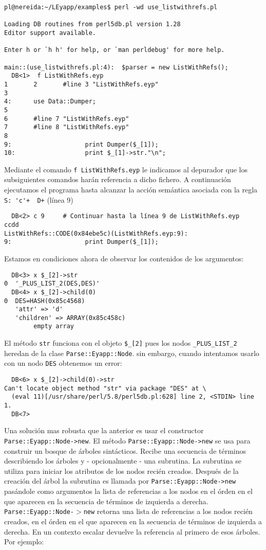 \begin{verbatim}
pl@nereida:~/LEyapp/examples$ perl -wd use_listwithrefs.pl

Loading DB routines from perl5db.pl version 1.28
Editor support available.

Enter h or `h h' for help, or `man perldebug' for more help.

main::(use_listwithrefs.pl:4):  $parser = new ListWithRefs();
  DB<1>  f ListWithRefs.eyp
1       2       #line 3 "ListWithRefs.eyp"
3
4:      use Data::Dumper;
5
6       #line 7 "ListWithRefs.eyp"
7       #line 8 "ListWithRefs.eyp"
8
9:                    print Dumper($_[1]);
10:                   print $_[1]->str."\n";
\end{verbatim}
Mediante el comando \verb|f ListWithRefs.eyp| le indicamos 
al depurador que los subsiguientes comandos harán referencia
a dicho fichero. A continuación ejecutamos el programa hasta alcanzar 
la acción semántica asociada con la regla \verb|S: 'c'+  D+|
(línea 9)
\begin{verbatim}
  DB<2> c 9     # Continuar hasta la línea 9 de ListWithRefs.eyp
ccdd
ListWithRefs::CODE(0x84ebe5c)(ListWithRefs.eyp:9):
9:                    print Dumper($_[1]);
\end{verbatim}
Estamos en condiciones ahora de observar los 
contenidos de los argumentos:
\begin{verbatim}
  DB<3> x $_[2]->str
0  '_PLUS_LIST_2(DES,DES)'
  DB<4> x $_[2]->child(0)
0  DES=HASH(0x85c4568)
   'attr' => 'd'
   'children' => ARRAY(0x85c458c)
        empty array
\end{verbatim}
El método \verb|str| funciona con el objeto \verb|$_[2]| pues 
los nodos \verb|_PLUS_LIST_2| heredan de la clase \verb|Parse::Eyapp::Node|.
sin embargo, cuando intentamos usarlo con un nodo \verb|DES| obtenemos un
error: 
\begin{verbatim}
  DB<6> x $_[2]->child(0)->str
Can't locate object method "str" via package "DES" at \
  (eval 11)[/usr/share/perl/5.8/perl5db.pl:628] line 2, <STDIN> line 1.
  DB<7>                      
\end{verbatim}
Una solución mas robusta que la anterior es usar el constructor \verb|Parse::Eyapp::Node->new|.
El método 
\verb|Parse::Eyapp::Node->new|
se usa para construir un bosque de árboles sintácticos.
Recibe una secuencia de términos describiendo los árboles
y - opcionalmente - una subrutina.
La subrutina se utiliza para iniciar los atributos
de los nodos recién creados. Después de la creación del árbol
la subrutina es llamada por \verb|Parse::Eyapp::Node->new|
pasándole como argumentos la lista de referencias a los nodos
en el órden en el que aparecen en la secuencia de términos
de izquierda a derecha.
\texttt{Parse::Eyapp::Node-$>$new} retorna una lista de
referencias a los nodos recién creados, 
en el órden en el que aparecen en la secuencia de términos
de izquierda a derecha. 
En un contexto escalar devuelve la referencia al primero
de esos árboles.
Por ejemplo:

